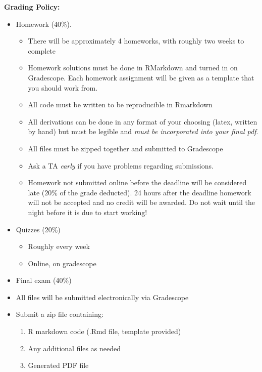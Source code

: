 \documentclass[]{article}
\begin{document}
\vspace*{.15in}

\noindent\textbf{Grading Policy:}

\begin{itemize}
\item Homework (40\%).
  \begin{itemize}
    \item There will be approximately 4 homeworks, with roughly two weeks to complete
    \item Homework solutions must be done in RMarkdown and turned in on Gradescope.  Each homework assignment will be given as a template that you should work from.
    \item All code must be written to be reproducible in Rmarkdown
    \item All derivations can be done in any format of your choosing (latex, written by hand) but must be legible and \emph{must be incorporated into your final pdf}.
    \item All files must be zipped together and submitted to Gradescope
    \item Ask a TA \emph{early} if you have problems regarding submissions. 
    \item Homework not submitted online before the deadline will
  be considered late ($20\%$ of the grade deducted). 24 hours after the deadline
  homework will not be accepted and no credit will be awarded. Do not
  wait until the night before it is due to start working!
  \end{itemize}

\item Quizzes (20\%)
  \begin{itemize}
    \item Roughly every week
    \item Online, on gradescope
  \end{itemize}
\item Final exam (40\%)
\end{itemize}


\begin{itemize}
\item  All files will be submitted electronically via Gradescope
\item  Submit a zip file containing:
  \begin{enumerate}
    \item R markdown code (.Rmd file, template provided)\\
    \item Any additional files as needed\\
    \item Generated PDF file
  \end{enumerate}
\end{itemize}
\end{document}
